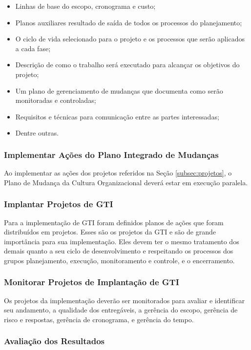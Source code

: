 \begin{itemize}
\item Linhas de base do escopo, cronograma e custo;
\item Planos auxiliares resultado de saída de todos os processos do planejamento; 
\item O ciclo de vida selecionado para o projeto e os processos que serão aplicados a cada fase; 
\item Descrição de como o trabalho será executado para alcançar os objetivos do projeto;
\item Um plano de gerenciamento de mudanças que documenta como serão monitoradas e controladas;
\item Requisitos e técnicas para comunicação entre as partes interessadas;
\item Dentre outras.
\end{itemize}

\subsubsection{Implementar Ações do Plano Integrado de Mudanças }

Ao implementar as ações dos projetos referidos na Seção \ref{subsec:projetos}, o Plano de Mudança da Cultura Organizacional deverá estar em execução paralela. 

\subsubsection{Implantar Projetos de GTI}

Para a implementação de GTI foram definidos planos de ações que foram distribuídos em projetos. Esses são os projetos da GTI e são de grande importância para sua implementação. Eles devem ter o mesmo tratamento dos demais quanto a seu ciclo de desenvolvimento e respeitando os processos dos grupos planejamento, execução, monitoramento e controle, e o encerramento.

\subsubsection{Monitorar Projetos de Implantação de GTI}

Os projetos da implementação deverão ser monitorados para avaliar e identificar seu andamento, a qualidade dos entregáveis, a gerência do escopo, gerência de risco e respostas, gerência de cronograma, e gerência do tempo.

\subsubsection{Avaliação dos Resultados} 

